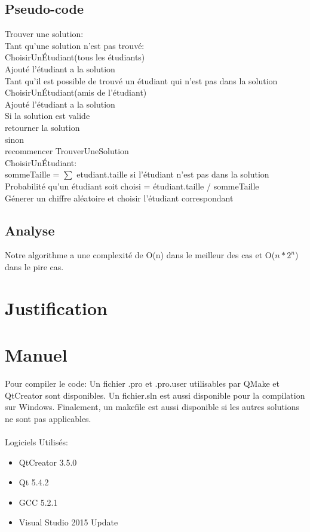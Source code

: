 \documentclass[a4paper, 12pt]{article} %
\newcommand\tab[1][1cm]{\hspace*{#1}}
\begin{document}
\subsection*{Pseudo-code}
Trouver une solution:\\
\tab    Tant qu'une solution n'est pas trouvé: \\
\tab\tab        ChoisirUnÉtudiant(tous les étudiants) \\
\tab\tab        Ajouté l'étudiant a la solution \\
\tab\tab        Tant qu'il est possible de trouvé un étudiant qui n'est pas dans la solution \\
\tab\tab\tab            ChoisirUnÉtudiant(amis de l'étudiant) \\
\tab\tab\tab            Ajouté l'étudiant a la solution \\
\tab\tab        Si la solution est valide \\
\tab\tab\tab            retourner la solution \\
\tab\tab        sinon \\
\tab\tab\tab            recommencer TrouverUneSolution\\
ChoisirUnÉtudiant:\\
\tab     sommeTaille = $\sum$ etudiant.taille si l'étudiant n'est pas dans la solution \\
\tab     Probabilité qu'un étudiant soit choisi = étudiant.taille / sommeTaille \\ 
\tab     Génerer un chiffre aléatoire et choisir l'étudiant correspondant\\
\subsection*{Analyse}
Notre algorithme a une complexité de O(n) dans le meilleur des cas et O($n*2^n$) dans le pire cas.
\section*{Justification}

\section*{Manuel}
Pour compiler le code:
Un fichier .pro et .pro.user utilisables par QMake et QtCreator sont disponibles.
Un fichier.sln est aussi disponible pour la compilation sur Windows.
Finalement, un makefile est aussi disponible si les autres solutions ne sont pas applicables.
\\
\\
Logiciels Utilisés:
\begin{itemize}
    \item QtCreator 3.5.0
    \item Qt 5.4.2
    \item GCC 5.2.1
    \item Visual Studio 2015 Update 
\end{itemize}



\end{document}
